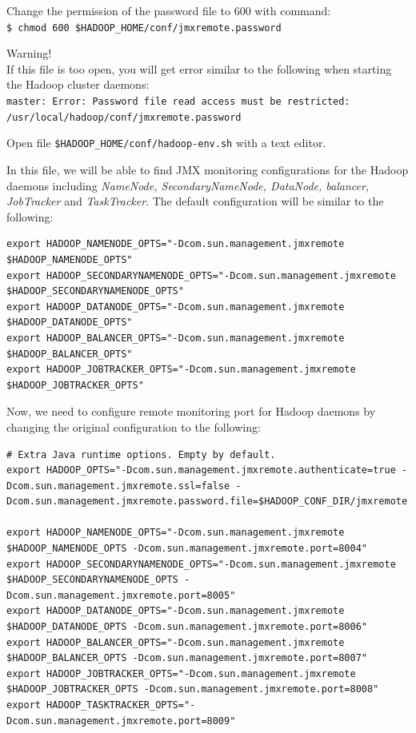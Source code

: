 Change the permission of the password file to 600 with command: \\
\verb|$ chmod 600 $HADOOP_HOME/conf/jmxremote.password|
\begin{warning}
Warning! \\
If this file is too open, you will get error similar to the following when starting the Hadoop cluster daemons: \\
\verb|master: Error: Password file read access must be restricted: /usr/local/hadoop/conf/jmxremote.password|
\end{warning}

Open file \verb|$HADOOP_HOME/conf/hadoop-env.sh| with a text editor.

In this file, we will be able to find JMX monitoring configurations for the Hadoop daemons including \emph{NameNode, SecondaryNameNode, DataNode, balancer, JobTracker} and \emph{TaskTracker}. The default configuration will be similar to the following:
\begin{verbatim}
export HADOOP_NAMENODE_OPTS="-Dcom.sun.management.jmxremote $HADOOP_NAMENODE_OPTS"
export HADOOP_SECONDARYNAMENODE_OPTS="-Dcom.sun.management.jmxremote $HADOOP_SECONDARYNAMENODE_OPTS"
export HADOOP_DATANODE_OPTS="-Dcom.sun.management.jmxremote $HADOOP_DATANODE_OPTS"
export HADOOP_BALANCER_OPTS="-Dcom.sun.management.jmxremote $HADOOP_BALANCER_OPTS"
export HADOOP_JOBTRACKER_OPTS="-Dcom.sun.management.jmxremote $HADOOP_JOBTRACKER_OPTS"
\end{verbatim}

Now, we need to configure remote monitoring port for Hadoop daemons by changing the original configuration to the following: 
\begin{verbatim}
# Extra Java runtime options. Empty by default.
export HADOOP_OPTS="-Dcom.sun.management.jmxremote.authenticate=true -Dcom.sun.management.jmxremote.ssl=false -Dcom.sun.management.jmxremote.password.file=$HADOOP_CONF_DIR/jmxremote.password"

export HADOOP_NAMENODE_OPTS="-Dcom.sun.management.jmxremote $HADOOP_NAMENODE_OPTS -Dcom.sun.management.jmxremote.port=8004"
export HADOOP_SECONDARYNAMENODE_OPTS="-Dcom.sun.management.jmxremote $HADOOP_SECONDARYNAMENODE_OPTS -Dcom.sun.management.jmxremote.port=8005"
export HADOOP_DATANODE_OPTS="-Dcom.sun.management.jmxremote $HADOOP_DATANODE_OPTS -Dcom.sun.management.jmxremote.port=8006"
export HADOOP_BALANCER_OPTS="-Dcom.sun.management.jmxremote $HADOOP_BALANCER_OPTS -Dcom.sun.management.jmxremote.port=8007"
export HADOOP_JOBTRACKER_OPTS="-Dcom.sun.management.jmxremote $HADOOP_JOBTRACKER_OPTS -Dcom.sun.management.jmxremote.port=8008"
export HADOOP_TASKTRACKER_OPTS="-Dcom.sun.management.jmxremote.port=8009"
\end{verbatim}


